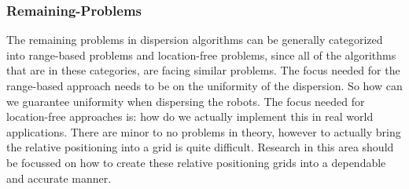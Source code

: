 \subsubsection{Remaining-Problems}
  The remaining problems in dispersion algorithms can be generally categorized into range-based problems and location-free problems, since all of the algorithms that are in these categories, are facing similar problems.
  The focus needed for the range-based approach needs to be on the uniformity of the dispersion. So how can we guarantee uniformity when dispersing the robots.
  The focus needed for location-free approaches is: how do we actually implement this in real world applications. There are minor to no problems in theory, however to actually bring the relative positioning into a grid is quite difficult. Research in this area should be focussed on how to create these relative positioning grids into a dependable and accurate manner.
